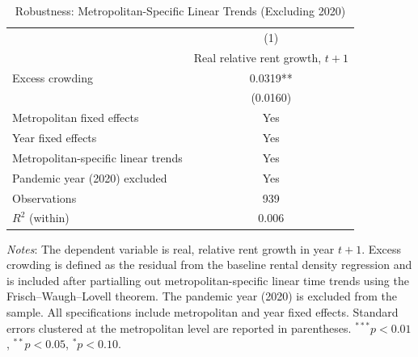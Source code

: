 \begin{table}[!htbp]
\centering
\caption{Robustness: Metropolitan-Specific Linear Trends (Excluding 2020)}
\label{tab:placebo_linear_trend_no_covid}
\begin{tabular}{l c}
\hline\hline
 & (1) \\
 & Real relative rent growth, $t+1$ \\
\hline
Excess crowding          & 0.0319** \\
                         & (0.0160) \\
\hline
Metropolitan fixed effects          & Yes \\
Year fixed effects                  & Yes \\
Metropolitan-specific linear trends & Yes \\
Pandemic year (2020) excluded       & Yes \\
Observations                        & 939 \\
$R^{2}$ (within)                    & 0.006 \\
\hline\hline
\end{tabular}

\begin{flushleft}
\footnotesize
\textit{Notes}: The dependent variable is real, relative rent growth in year $t+1$.
Excess crowding is defined as the residual from the baseline rental density regression
and is included after partialling out metropolitan-specific linear time trends using
the Frisch--Waugh--Lovell theorem. The pandemic year (2020) is excluded from the sample.
All specifications include metropolitan and year fixed effects. Standard errors
clustered at the metropolitan level are reported in parentheses.
$^{***}p<0.01$, $^{**}p<0.05$, $^{*}p<0.10$.
\end{flushleft}
\end{table}
